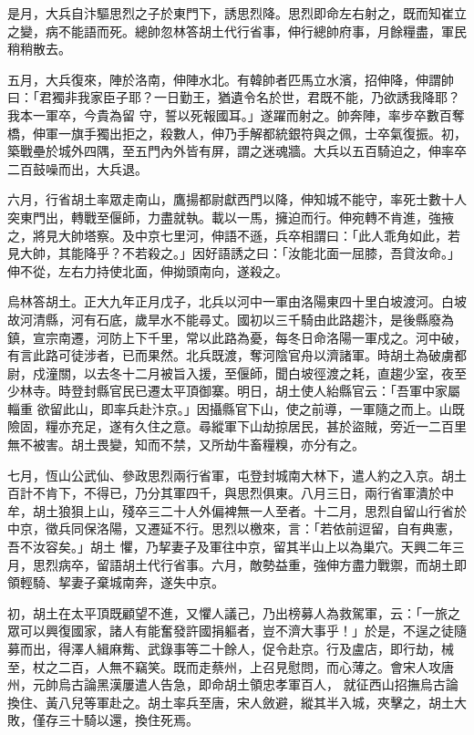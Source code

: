 \begin{pinyinscope}
 是月，大兵自汴驅思烈之子於東門下，誘思烈降。思烈即命左右射之，既而知崔立之變，病不能語而死。總帥忽林答胡土代行省事，伸行總帥府事，月餘糧盡，軍民稍稍散去。



 五月，大兵復來，陣於洛南，伸陣水北。有韓帥者匹馬立水濱，招伸降，伸謂帥曰：「君獨非我家臣子耶？一日勤王，猶遺令名於世，君既不能，乃欲誘我降耶？我本一軍卒，今貴為留
 守，誓以死報國耳。」遂躍而射之。帥奔陣，率步卒數百奪橋，伸軍一旗手獨出拒之，殺數人，伸乃手解都統銀符與之佩，士卒氣復振。初，築戰壘於城外四隅，至五門內外皆有屏，謂之迷魂牆。大兵以五百騎迫之，伸率卒二百鼓噪而出，大兵退。



 六月，行省胡土率眾走南山，鷹揚都尉獻西門以降，伸知城不能守，率死士數十人突東門出，轉戰至偃師，力盡就執。載以一馬，擁迫而行。伸宛轉不肯進，強掖之，將見大帥塔察。及中京七里河，伸語不遜，兵卒相謂曰：「此人乖角如此，若見大帥，其能降乎？不若殺之。」因好語誘之曰：「汝能北面一屈膝，吾貸汝命。」
 伸不從，左右力持使北面，伸拗頭南向，遂殺之。



 烏林答胡土。正大九年正月戊子，北兵以河中一軍由洛陽東四十里白坡渡河。白坡故河清縣，河有石底，歲旱水不能尋丈。國初以三千騎由此路趨汴，是後縣廢為鎮，宣宗南遷，河防上下千里，常以此路為憂，每冬日命洛陽一軍戍之。河中破，有言此路可徒涉者，已而果然。北兵既渡，奪河陰官舟以濟諸軍。時胡土為破虜都尉，戍潼關，以去冬十二月被旨入援，至偃師，聞白坡徑渡之耗，直趨少室，夜至少林寺。時登封縣官民已遷太平頂御寨。明日，胡土使人紿縣官云：「吾軍中家屬輜重
 欲留此山，即率兵赴汴京。」因攝縣官下山，使之前導，一軍隨之而上。山既險固，糧亦充足，遂有久住之意。尋縱軍下山劫掠居民，甚於盜賊，旁近一二百里無不被害。胡土畏變，知而不禁，又所劫牛畜糧糗，亦分有之。



 七月，恆山公武仙、參政思烈兩行省軍，屯登封城南大林下，遣人約之入京。胡土百計不肯下，不得已，乃分其軍四千，與思烈俱東。八月三日，兩行省軍潰於中牟，胡土狼狽上山，殘卒三二十人外偏裨無一人至者。十二月，思烈自留山行省於中京，徵兵同保洛陽，又遷延不行。思烈以檄來，言：「若依前逗留，自有典憲，吾不汝容矣。」胡土
 懼，乃挈妻子及軍往中京，留其半山上以為巢穴。天興二年三月，思烈病卒，留語胡土代行省事。六月，敵勢益重，強伸方盡力戰禦，而胡土即領輕騎、挈妻子棄城南奔，遂失中京。



 初，胡土在太平頂既顧望不進，又懼人議己，乃出榜募人為救駕軍，云：「一旅之眾可以興復國家，諸人有能奮發許國捐軀者，豈不濟大事乎！」於是，不逞之徒隨募而出，得澤人緝麻觜、武錄事等二十餘人，促令赴京。行及盧店，即行劫，械至，杖之二百，人無不竊笑。既而走蔡州，上召見慰問，而心薄之。會宋人攻唐州，元帥烏古論黑漢屢遣人告急，即命胡土領忠孝軍百人，
 就征西山招撫烏古論換住、黃八兒等軍赴之。胡土率兵至唐，宋人斂避，縱其半入城，夾擊之，胡土大敗，僅存三十騎以還，換住死焉。




\end{pinyinscope}
